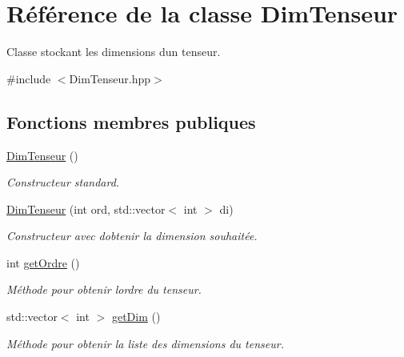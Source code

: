 \hypertarget{classDimTenseur}{}\section{Référence de la classe Dim\+Tenseur}
\label{classDimTenseur}


Classe stockant les dimensions d\textquotesingle{}un tenseur.  




{\ttfamily \#include $<$Dim\+Tenseur.\+hpp$>$}

\subsection*{Fonctions membres publiques}
\begin{DoxyCompactItemize}
\item 
\mbox{\label{classDimTenseur_a599e42c7842cec590b226d3ac676933e}} 
\hyperlink{classDimTenseur_a599e42c7842cec590b226d3ac676933e}{Dim\+Tenseur} ()
\begin{DoxyCompactList}\small\item\em Constructeur standard. \end{DoxyCompactList}\item 
\mbox{\label{classDimTenseur_aa0faeff63ad7ca344ee327ec974001fe}} 
\hyperlink{classDimTenseur_aa0faeff63ad7ca344ee327ec974001fe}{Dim\+Tenseur} (int ord, std\+::vector$<$ int $>$ di)
\begin{DoxyCompactList}\small\item\em Constructeur avec d\textquotesingle{}obtenir la dimension souhaitée. \end{DoxyCompactList}\item 
int \hyperlink{classDimTenseur_a0d1e2833c775440baad2ac390cc6e135}{get\+Ordre} ()
\begin{DoxyCompactList}\small\item\em Méthode pour obtenir l\textquotesingle{}ordre du tenseur. \end{DoxyCompactList}\item 
std\+::vector$<$ int $>$ \hyperlink{classDimTenseur_a987995f83a0c8debb5f75edb59dad3b0}{get\+Dim} ()
\begin{DoxyCompactList}\small\item\em Méthode pour obtenir la liste des dimensions du tenseur. \end{DoxyCompactList}\end{DoxyCompactItemize}


